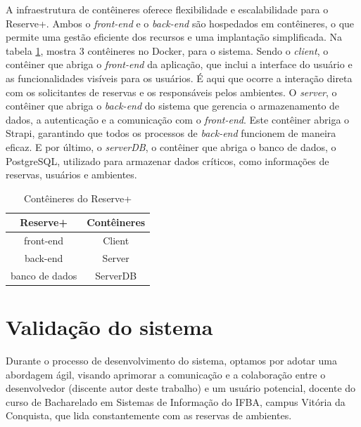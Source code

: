 \documentclass[12pt]{article}
\begin{document}
A infraestrutura de contêineres oferece flexibilidade e escalabilidade para o Reserve+. Ambos o \textit{front-end} e o \textit{back-end} são hospedados em contêineres, o que permite uma gestão eficiente dos recursos e uma implantação simplificada. Na tabela \ref{tab:containeres}, mostra 3 contêineres no Docker, para o sistema. Sendo o \textit{client}, o contêiner que abriga o \textit{front-end} da aplicação, que inclui a interface do usuário e as funcionalidades visíveis para os usuários. É aqui que ocorre a interação direta com os solicitantes de reservas e os responsáveis pelos ambientes. O \textit{server}, o contêiner que abriga o \textit{back-end} do sistema que gerencia o armazenamento de dados, a autenticação e a comunicação com o \textit{front-end}. Este contêiner abriga o Strapi, garantindo que todos os processos de \textit{back-end} funcionem de maneira eficaz. E por último, o \textit{serverDB}, o contêiner que abriga o banco de dados, o PostgreSQL, utilizado para armazenar dados críticos, como informações de reservas, usuários e ambientes.

\begin{table}[ht]
\centering
\caption{Contêineres do Reserve+}
\label{tab:containeres}
\begin{tabular}{ |c|c| } 
 \hline
 \textbf{Reserve+} & \textbf{Contêineres} \\ 
 \hline
 front-end & Client \\ 
 \hline
 back-end & Server \\ 
 \hline
 banco de dados & ServerDB \\ 
 \hline
\end{tabular}
\end{table}

\section{Validação do sistema} \label{sec:validacao}

Durante o processo de desenvolvimento do sistema, optamos por adotar uma abordagem ágil, visando aprimorar a comunicação e a colaboração entre o desenvolvedor (discente autor deste trabalho) e um usuário potencial, docente do curso de Bacharelado em Sistemas de Informação do IFBA, campus Vitória da Conquista, que lida constantemente com as reservas de ambientes.
\end{document}
